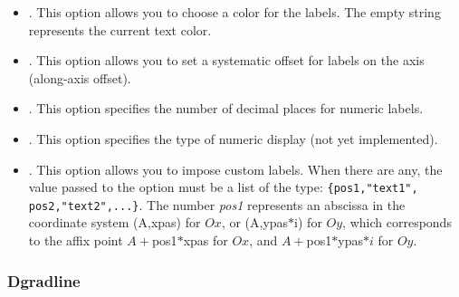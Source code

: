 \begin{itemize}
\begin{itemize}
    \item {}. This option allows you to choose a color for the labels. The empty string represents the current text color.
    \item {}. This option allows you to set a systematic offset for labels on the axis (along-axis offset).
    \item {}. This option specifies the number of decimal places for numeric labels.
    \item {}. This option specifies the type of numeric display (not yet implemented).
    \item {}. This option allows you to impose custom labels. When there are any, the value passed to the option must be a list of the type: \verb|{pos1,"text1", pos2,"text2",...}|. The number \emph{pos1} represents an abscissa in the coordinate system (A,xpas) for $Ox$, or (A,ypas$*$i) for $Oy$, which corresponds to the affix point $A+$pos1$*$xpas for $Ox$, and $A+$pos1$*$ypas$*i$ for $Oy$.
\end{itemize}
\end{itemize}

\subsubsection{Dgradline}

